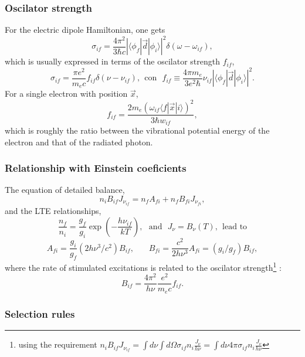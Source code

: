 \begin{frame}
\end{frame} \begin{frame}\frametitle{Oscilator strength}

For the electric dipole Hamiltonian, one gets
 \[ \sigma_{if} = \frac{4 \pi^2}{3  \hbar c }     \left|  \langle \phi_f| \vec{d} |\phi_i \rangle \right|^2   \delta(\omega-\omega_{if}),  \]
which is usually expressed in terms of the oscilator strength $f_{if}$,
 \[ \sigma_{if} = \frac{\pi e^2}{m_e c }  f_{if}     \delta(\nu-\nu_{if}),  ~~\text{con} ~~~
f_{if} \equiv \frac{ 4 \pi m_e } {3 e^2 \hbar} \nu_{if} \left| \langle
\phi_f| \vec{d} |\phi_i \rangle \right|^2. \] For a single electron
 with position $\vec{x}$, \[ f_{if} = \frac{ 2 m_e ( \omega_{if}
\langle f | \vec{x}| i \rangle )^2}{3 \hbar w_{if}}, \] which is
roughly the ratio between the vibrational potential energy of the
electron and that of the radiated photon.



\end{frame} \begin{frame}\frametitle{Relationship with Einstein coeficients}

The equation of detailed balance, 
\[n_i B_{if} J_{\nu_{if}} = n_f A_{fi} + n_f B_{fi} J_{\nu_{fi}}, \]
and the LTE relationships,
\[\frac{n_f}{n_i} = \frac{g_f}{g_i} \exp(-\frac{h\nu_{if}}{kT}),
~~~\text{and}~~~J_{\nu} = B_{\nu}(T),~~\text{lead~to} \]
\[ A_{fi} = \frac{g_i}{g_f} (2 h \nu^3 / c^2 ) B_{if} , ~~~~~~~~ B_{fi} = \frac{c^2}{2 h \nu^3} A_{fi} = (g_i / g_f ) B_{if}, \]
where the rate of stimulated  excitations is related to the
oscilator strength\footnote{using the requirement $n_i B_{if} J_{\nu_{if}} = \int d\nu \int d\Omega
\sigma_{if} n_i \frac{J_\nu}{h\nu} = \int d\nu  4\pi \sigma_{if} n_i \frac{J_\nu}{h\nu}$}
:
\[ B_{if} = \frac{4 \pi^2 }{h \nu} \frac{e^2}{m_e c} f_{if}.\]



\end{frame} \begin{frame}\frametitle{Selection rules}


\end{frame}
